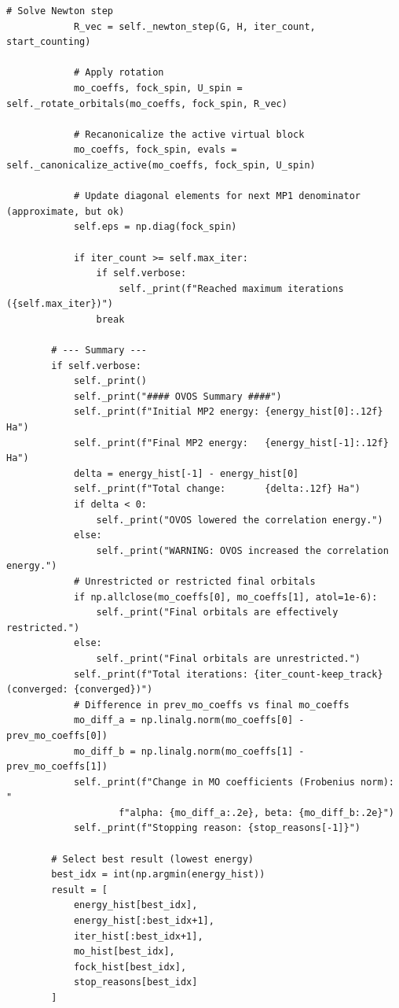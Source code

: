\begin{lstlisting}[style=python, caption={...}, label=lst:full_code]
            # Solve Newton step
            R_vec = self._newton_step(G, H, iter_count, start_counting)

            # Apply rotation
            mo_coeffs, fock_spin, U_spin = self._rotate_orbitals(mo_coeffs, fock_spin, R_vec)

            # Recanonicalize the active virtual block
            mo_coeffs, fock_spin, evals = self._canonicalize_active(mo_coeffs, fock_spin, U_spin)

            # Update diagonal elements for next MP1 denominator (approximate, but ok)
            self.eps = np.diag(fock_spin)

            if iter_count >= self.max_iter:
                if self.verbose:
                    self._print(f"Reached maximum iterations ({self.max_iter})")
                break

        # --- Summary ---
        if self.verbose:
            self._print()
            self._print("#### OVOS Summary ####")
            self._print(f"Initial MP2 energy: {energy_hist[0]:.12f} Ha")
            self._print(f"Final MP2 energy:   {energy_hist[-1]:.12f} Ha")
            delta = energy_hist[-1] - energy_hist[0]
            self._print(f"Total change:       {delta:.12f} Ha")
            if delta < 0:
                self._print("OVOS lowered the correlation energy.")
            else:
                self._print("WARNING: OVOS increased the correlation energy.")
            # Unrestricted or restricted final orbitals
            if np.allclose(mo_coeffs[0], mo_coeffs[1], atol=1e-6):
                self._print("Final orbitals are effectively restricted.")
            else:
                self._print("Final orbitals are unrestricted.")
            self._print(f"Total iterations: {iter_count-keep_track} (converged: {converged})")
            # Difference in prev_mo_coeffs vs final mo_coeffs
            mo_diff_a = np.linalg.norm(mo_coeffs[0] - prev_mo_coeffs[0])
            mo_diff_b = np.linalg.norm(mo_coeffs[1] - prev_mo_coeffs[1])
            self._print(f"Change in MO coefficients (Frobenius norm): "
                    f"alpha: {mo_diff_a:.2e}, beta: {mo_diff_b:.2e}")
            self._print(f"Stopping reason: {stop_reasons[-1]}")

        # Select best result (lowest energy)
        best_idx = int(np.argmin(energy_hist)) 
        result = [
            energy_hist[best_idx],
            energy_hist[:best_idx+1],
            iter_hist[:best_idx+1],
            mo_hist[best_idx],
            fock_hist[best_idx],
            stop_reasons[best_idx]
        ]


\end{lstlisting}
